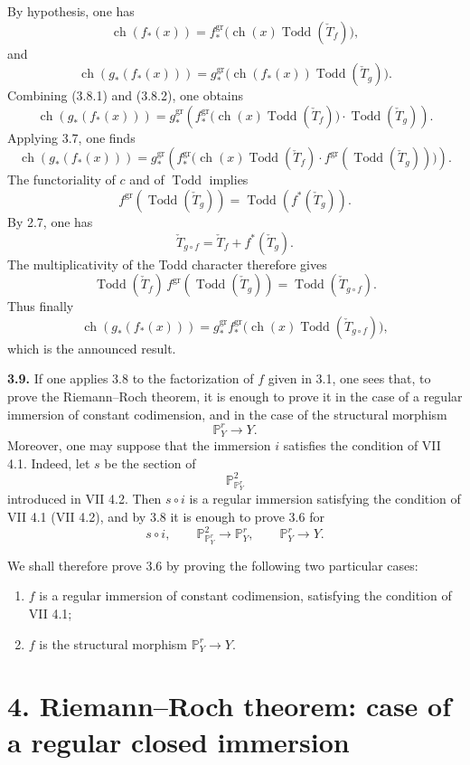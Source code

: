 \documentclass[11pt]{article}
\newcommand{\ch}{\operatorname{ch}}
\newcommand{\Todd}{\operatorname{Todd}}
\providecommand{\ch}{\operatorname{ch}}
\providecommand{\Todd}{\operatorname{Todd}}
\begin{document}
By hypothesis, one has
\begin{equation}\tag{3.8.1}
 \ch(f_*(x))=
 f^{\mathrm{gr}}_*\bigl(\ch(x)\Todd(\check T_f)\bigr),
\end{equation}
and
\begin{equation}\tag{3.8.2}
 \ch(g_*(f_*(x)))=
 g^{\mathrm{gr}}_*\bigl(\ch(f_*(x))\Todd(\check T_g)\bigr).
\end{equation}
Combining (3.8.1) and (3.8.2), one obtains
\[
\ch(g_*(f_*(x)))=
g^{\mathrm{gr}}_*\!\left(
 f^{\mathrm{gr}}_*\bigl(\ch(x)\Todd(\check T_f)\bigr)\cdot \Todd(\check T_g)
\right).
\]
Applying 3.7, one finds
\[
\ch(g_*(f_*(x)))=
g^{\mathrm{gr}}_*\!\left(
 f^{\mathrm{gr}}_*\bigl(\ch(x)\Todd(\check T_f)\cdot
 f^{\mathrm{gr}}(\Todd(\check T_g))\bigr)
\right).
\]
The functoriality of \(c\) and of \(\Todd\) implies
\[
 f^{\mathrm{gr}}(\Todd(\check T_g))=\Todd(f^*(\check T_g)).
\]
By 2.7, one has
\[
 \check T_{g\circ f}=\check T_f+f^*(\check T_g).
\]
The multiplicativity of the Todd character therefore gives
\[
 \Todd(\check T_f)\,f^{\mathrm{gr}}(\Todd(\check T_g))
 =
 \Todd(\check T_{g\circ f}).
\]
Thus finally
\[
 \ch(g_*(f_*(x)))=
 g^{\mathrm{gr}}_* f^{\mathrm{gr}}_*\bigl(\ch(x)\Todd(\check T_{g\circ f})\bigr),
\]
which is the announced result.

\textbf{3.9.} If one applies 3.8 to the factorization of \(f\) given in 3.1, one sees that, to prove the Riemann--Roch theorem, it is enough to prove it in the case of a regular immersion of constant codimension, and in the case of the structural morphism
\[
 \mathbb P^r_Y\longrightarrow Y .
\]
Moreover, one may suppose that the immersion \(i\) satisfies the condition of VII 4.1. Indeed, let \(s\) be the section of
\[
 \mathbb P^2_{\mathbb P^r_Y}
\]
introduced in VII 4.2. Then \(s\circ i\) is a regular immersion satisfying the condition of VII 4.1 (VII 4.2), and by 3.8 it is enough to prove 3.6 for
\[
s\circ i,\qquad
\mathbb P^2_{\mathbb P^r_Y}\longrightarrow\mathbb P^r_Y,\qquad
\mathbb P^r_Y\longrightarrow Y .
\]

We shall therefore prove 3.6 by proving the following two particular cases:
\begin{enumerate}[label=\roman*)]
\item \(f\) is a regular immersion of constant codimension, satisfying the condition of VII 4.1;
\item \(f\) is the structural morphism \(\mathbb P^r_Y\to Y\).
\end{enumerate}

\section*{4. Riemann--Roch theorem: case of a regular closed immersion}
\end{document}
